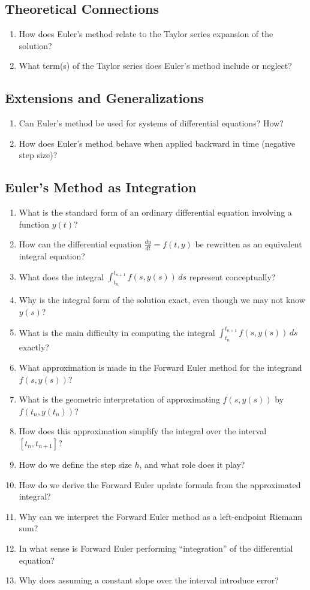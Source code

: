 \subsection{Theoretical Connections}
\begin{enumerate}[resume]
  \item How does Euler's method relate to the Taylor series expansion of the solution?
  \item What term(s) of the Taylor series does Euler's method include or neglect?
\end{enumerate}

\subsection{Extensions and Generalizations}
\begin{enumerate}[resume]
  \item Can Euler's method be used for systems of differential equations? How?
  \item How does Euler's method behave when applied backward in time (negative step size)?
\end{enumerate}

\subsection{Euler's Method as Integration}
\begin{enumerate}[resume]
  \item What is the standard form of an ordinary differential equation involving a function \(y(t)\)?
  \item How can the differential equation \(\frac{dy}{dt}= f(t,y)\) be rewritten as an equivalent integral equation?
  \item What does the integral \(\int_{t_{n}}^{t_{n+1}}f(s, y(s))\,ds\) represent conceptually?
  \item Why is the integral form of the solution exact, even though we may not know \(y(s)\)?
  \item What is the main difficulty in computing the integral \(\int_{t_{n}}^{t_{n+1}}f(s, y(s))\,ds\) exactly?
  \item What approximation is made in the Forward Euler method for the integrand \(f(s, y(s))\)?
  \item What is the geometric interpretation of approximating \(f(s, y(s))\) by \(f(t_{n}, y(t_{n}))\)?
  \item How does this approximation simplify the integral over the interval \([t_{n}, t_{n+1}]\)?
  \item How do we define the step size \(h\), and what role does it play?
  \item How do we derive the Forward Euler update formula from the approximated integral?
  \item Why can we interpret the Forward Euler method as a left-endpoint Riemann sum?
  \item In what sense is Forward Euler performing “integration” of the differential equation?
  \item Why does assuming a constant slope over the interval introduce error?
\end{enumerate}
